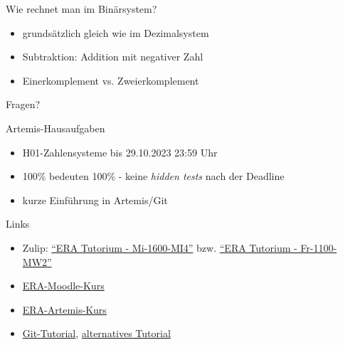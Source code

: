 \documentclass[
  german,            %
  aspectratio=169,    %
]{tumbeamer}
\begin{document}
\begin{frame}[c]{Wie rechnet man im Binärsystem?}{}
  \begin{itemize}
    \item grundsätzlich gleich wie im Dezimalsystem
    \item Subtraktion: Addition mit negativer Zahl
    \item Einerkomplement vs. Zweierkomplement
  \end{itemize}
\end{frame}

\begin{frame}[c]{}{}
  \begin{center}
    \LARGE Fragen?
  \end{center}
\end{frame}

\begin{frame}[c]{Artemis-Hausaufgaben}{}
  \begin{itemize}
    \item H01-Zahlensysteme bis 29.10.2023 23:59 Uhr
    \item 100\% bedeuten 100\% - keine \emph{hidden tests} nach der Deadline
    \item kurze Einführung in Artemis/Git
  \end{itemize}
\end{frame}

\begin{frame}[fragile, c]{Links}{}
  \begin{itemize}
    \item Zulip: \href{https://zulip.in.tum.de/#narrow/stream/1917-ERA-Tutorium---Mi-1600-MI4}{\enquote{ERA Tutorium - Mi-1600-MI4}}
    bzw. \href{https://zulip.in.tum.de/#narrow/stream/1940-ERA-Tutorium---Fr-1100-MW2}{\enquote{ERA Tutorium - Fr-1100-MW2}}
    \item \href{https://www.moodle.tum.de/course/view.php?id=90679}{ERA-Moodle-Kurs}
    \item \href{https://artemis.in.tum.de/courses/288/exercises}{ERA-Artemis-Kurs}
    \item \href{https://git-scm.com/docs/gittutorial}{Git-Tutorial}, \href{https://rogerdudler.github.io/git-guide/}{alternatives Tutorial}
  \end{itemize}
\end{frame}

\maketitle
\end{document}

